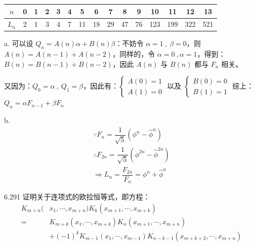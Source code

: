 \begin{table}[ht]
  \centering
  {\color{grayblack}
    \begin{tabular}{c|cccccccccccccc}
      \toprule
      \( n \) & 0 & 1 & 2 & 3 & 4 & 5 & 6 & 7 & 8 & 9 & 10 & 11 & 12 & 13 \\
      \midrule
      \( L_n \) & 2 & 1 & 3 & 4 & 7 & 11 & 18 & 29 & 47 & 76 & 123 & 199 & 322 & 521 \\
      \bottomrule
  \end{tabular}}
\end{table}

a. 可以设 \( Q_n = A(n) \alpha + B(n) \beta \)：不妨令 \( \alpha = 1 \ , \ \beta = 0 \)，则 \( A(n) = A(n-1) + A(n-2) \)，同样的，令 \( \alpha = 0 \ , \alpha = 1 \)，得到：\( B(n) = B(n-1) + B(n-2) \)，因此 \( A(n) \) 与 \( B(n) \) 都与 \( F_n \) 相关。

又因为：\( Q_0 = \alpha \ , \ Q_1 = \beta \)，因此有：\(
  \begin{cases}
    A(0) = 1 \\
    A(1) = 0
\end{cases} \)
以及 \(
  \begin{cases}
    B(0) = 0 \\
    B(1) = 1
\end{cases} \)
综上：\( Q_n = \alpha F_{n-1} + \beta F_n \)

b.
\begin{gather*}
  \because F_n = \dfrac{1}{\sqrt{5}} (\phi^n - \hat{\phi}^n) \\
  \therefore F_{2n} = \dfrac{1}{\sqrt{5}} (\phi^{2n} - \hat{\phi}^{2n}) \\
  \Rightarrow L_n = \dfrac{F_{2n}}{F_n} = \phi^n + \hat{\phi}^n
\end{gather*}

\begin{problem}{6.29}{1}
  证明关于连项式的欧拉恒等式，即方程：
  \begin{align*}
    K_{m+n}(&x_1, \cdots, x_{m+n}) K_k(x_{m+1}, \cdots, x_{m+k}) \\
    = &K_{m+k}(x_1, \cdots, x_{m+k}) K_n(x_{m+1}, \cdots, x_{m+n}) \\
    &+ (-1)^k K_{m-1}(x_1, \cdots, x_{m-1}) K_{n-k-1}(x_{m+k+2}, \cdots, x_{m+n})
  \end{align*}
\end{problem}

